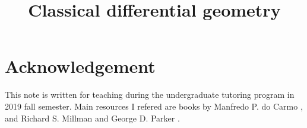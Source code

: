 \documentclass{../exp}
\title{Classical differential geometry}
\begin{document}
\maketitle
\tableofcontents



%






\section*{Acknowledgement}
This note is written for teaching during the undergraduate tutoring program in 2019 fall semester.
Main resources I refered are books by Manfredo P. do Carmo \cite{}, and Richard S. Millman and George D. Parker \cite{}.
\end{document}
